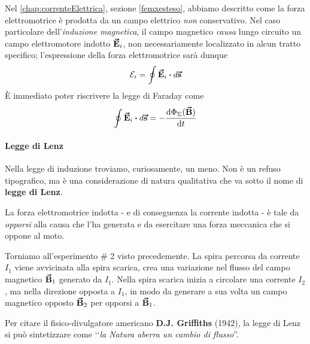 \begin{observe} %
	Nel \autoref{chap:correnteElettrica}, sezione \ref{femxesteso}, abbiamo descritto come la forza elettromotrice è prodotta da un campo elettrico \textit{non} conservativo. Nel caso particolare dell'\textit{induzione magnetica}, il campo magnetico \textit{causa} lungo circuito un campo elettromotore indotto $\vb*{\va{E}}_i$, non necessariamente localizzato in alcun tratto specifico; l'espressione della forza elettromotrice sarà dunque
	\begin{equation*}
		\mathcal{E}_i=\oint\vba{E}_i\vdot d\vba{s}
	\end{equation*}
	È immediato poter riscrivere la legge di Faraday come
	\begin{equation}
		\oint \vba E_i\vdot d\vba s =-\dv{\Phi_{\Sigma}(\vba B)}{t}		
	\end{equation}
\end{observe}
\paragraph{Legge di Lenz}
Nella legge di induzione troviamo, curiosamente, un meno. Non è un refuso tipografico, ma è una considerazione di natura qualitativa che va sotto il nome di \textbf{legge di Lenz}.
\begin{corollaryqed}
	La forza elettromotrice indotta - e di conseguenza la corrente indotta - è tale da \textit{opporsi} alla causa che l'ha generata e da esercitare una forza meccanica che si oppone al moto. 
\end{corollaryqed}
\begin{observe}
	Torniamo all'esperimento \# 2 visto precedemente. La spira percorsa da corrente $I_1$ viene avvicinata alla spira scarica, crea una variazione nel flusso del campo magnetico $\vb*{\va{B}}_1$ generato da $I_1$. Nella spira scarica inizia a circolare una corrente $I_2$, ma nella direzione opposta a $I_1$, in modo da generare a sua volta un campo magnetico opposto $\vb*{\va{B}}_2$ per opporsi a $\vb*{\va{B}}_1$.  
\end{observe}
Per citare il fisico-divulgatore americano \textbf{D.J. Griffiths} (1942), la legge di Lenz si può sintetizzare come ‘‘\textit{la Natura aberra un cambio di flusso}''.
